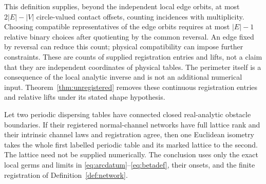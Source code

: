 This definition supplies, beyond the independent local edge orbits,
at most $2|E|-|V|$ circle-valued contact offsets, counting incidences
with multiplicity. Choosing compatible representatives of the edge
orbits requires at most $|E|-1$ relative binary choices after quotienting
by the common reversal. An edge fixed by reversal can reduce this count;
physical compatibility can impose further constraints. These are counts
of supplied registration entries and lifts, not a claim that they are
independent coordinates of physical tables. The perimeter itself is a
consequence of the local analytic inverse and is not an additional
numerical input. Theorem~\ref{thm:unregistered} removes these continuous
registration entries and relative lifts under its stated shape hypothesis.

\begin{theorem}\label{thm:network}
Let two periodic dispersing tables have connected closed real-analytic
obstacle boundaries. If their registered normal-channel networks have
full lattice rank and their intrinsic channel laws and registration agree,
then one Euclidean isometry takes the whole first labelled periodic table
and its marked lattice to the second. The lattice need not be supplied
numerically. The conclusion uses only the exact local germs and limits in
\eqref{eq:arcdatum}--\eqref{eq:betadef}, their onsets, and the finite
registration of Definition~\ref{def:network}.
\end{theorem}
